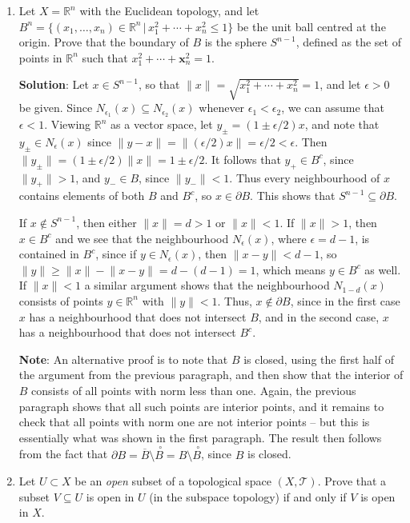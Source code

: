 \documentclass[letterpaper,12pt]{article}
\newcommand{\len}[1]{\lVert #1\rVert}
\newcommand{\R}{\mathbb{R}}
\newcommand{\x}{\mathbf{x}}
\newcommand{\inter}[1]{\overset{\,\,\circ}{#1}}
\newcommand{\T}{\mathcal{T}}
\begin{document}
\begin{enumerate}
\item Let $X=\R^n$ with the Euclidean topology, and let $B^n=\{(x_1,\ldots, x_n)\in\R^n\,|\, x_1^2+\cdots +x_n^2\leq 1\}$ be the unit ball centred at the origin. Prove that the boundary of $B$ is the sphere $S^{n-1}$, defined as the set of points in $\R^n$ such that $x_1^2+\cdots + \x_n^2 = 1$.

\bigskip

{\bf Solution}: Let $x\in S^{n-1}$, so that $\len{x}=\sqrt{x_1^2+\cdots +x_n^2}=1$, and let $\epsilon>0$ be given. Since $N_{\epsilon_1}(x)\subseteq N_{\epsilon_2}(x)$ whenever $\epsilon_1<\epsilon_2$, we can assume that $\epsilon<1$. Viewing $\R^n$ as a vector space, let $y_\pm = (1\pm\epsilon/2)x$, and note that $y_\pm\in N_\epsilon(x)$ since $\len{y-x} = \len{(\epsilon/2)x} = \epsilon/2<\epsilon$. Then $\len{y_\pm} = (1\pm \epsilon/2)\len{x} = 1\pm \epsilon/2$. It follows that $y_+\in B^c$, since $\len{y_+}>1$, and $y_-\in B$, since $\len{y_-}<1$. Thus every neighbourhood of $x$ contains elements of both $B$ and $B^c$, so $x\in \partial B$. This shows that $S^{n-1}\subseteq \partial B$. 

If $x\notin S^{n-1}$, then either $\len{x}=d>1$ or $\len{x}<1$. If $\len{x}>1$, then $x\in B^c$ and we see that the neighbourhood $N_\epsilon(x)$, where $\epsilon = d-1$, is contained in $B^c$, since if $y\in N_\epsilon(x)$, then $\len{x-y}<d-1$, so $\len{y}\geq \len{x}-\len{x-y} = d-(d-1) = 1$, which means $y\in B^c$ as well. If $\len{x}<1$ a similar argument shows that the neighbourhood $N_{1-d}(x)$ consists of points $y\in\R^n$ with $\len{y}<1$. Thus, $x\notin \partial B$, since in the first case $x$ has a neighbourhood that does not intersect $B$, and in the second case, $x$ has a neighbourhood that does not intersect $B^c$.

{\bf Note}: An alternative proof is to note that $B$ is closed, using the first half of the argument from the previous paragraph, and then show that the interior of $B$ consists of all points with norm less than one. Again, the previous paragraph shows that all such points are interior points, and it remains to check that all points with norm one are not interior points -- but this is essentially what was shown in the first paragraph. The result then follows from the fact that $\partial B = \overline{B} \setminus \inter{B} = B\setminus \inter{B}$, since $B$ is closed.

\item Let $U\subset X$ be an {\em open} subset of a topological space $(X,\T)$. Prove that a subset $V\subseteq U$ is open in $U$ (in the subspace topology) if and only if $V$ is open in $X$.


\end{enumerate}
\end{document}
